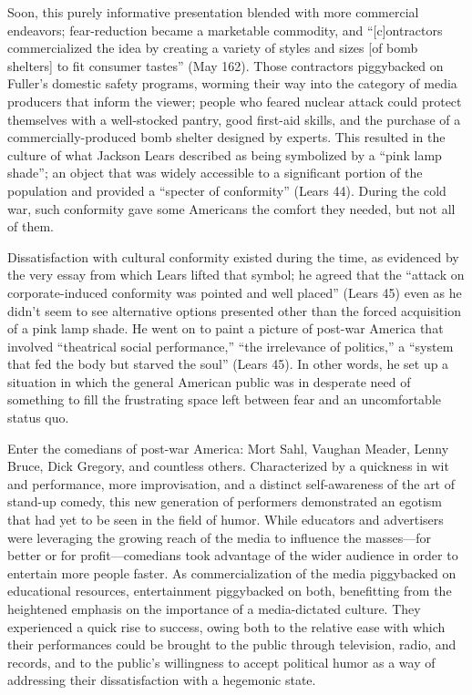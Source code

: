 Soon, this purely informative presentation blended with more commercial
endeavors; fear-reduction became a marketable commodity, and ``[c]ontractors
commercialized the idea by creating a variety of styles and sizes [of bomb
shelters] to fit consumer tastes'' (May 162). Those contractors piggybacked on
Fuller's domestic safety programs, worming their way into the category of media
producers that inform the viewer; people who feared nuclear attack could protect
themselves with a well-stocked pantry, good first-aid skills, and the purchase
of a commercially-produced bomb shelter designed by experts. This resulted in
the culture of what Jackson Lears described as being symbolized by a ``pink lamp
shade''; an object that was widely accessible to a significant portion of the
population and provided a ``specter of conformity'' (Lears 44). During the cold
war, such conformity gave some Americans the comfort they needed, but not all of
them.

Dissatisfaction with cultural conformity existed during the time, as evidenced
by the very essay from which Lears lifted that symbol; he agreed that the
``attack on corporate-induced conformity was pointed and well placed'' (Lears 45)
even as he didn't seem to see alternative options presented other than the
forced acquisition of a pink lamp shade. He went on to paint a picture of
post-war America that involved ``theatrical social performance,'' ``the irrelevance
of politics,'' a ``system that fed the body but starved the soul'' (Lears 45). In
other words, he set up a situation in which the general American public was in
desperate need of something to fill the frustrating space left between fear and
an uncomfortable status quo.

Enter the comedians of post-war America: Mort Sahl, Vaughan Meader, Lenny Bruce,
Dick Gregory, and countless others. Characterized by a quickness in wit and
performance, more improvisation, and a distinct self-awareness of the art of
stand-up comedy, this new generation of performers demonstrated an egotism that
had yet to be seen in the field of humor. While educators and advertisers were
leveraging the growing reach of the media to influence the masses—for better or
for profit—comedians took advantage of the wider audience in order to entertain
more people faster. As commercialization of the media piggybacked on educational
resources, entertainment piggybacked on both, benefitting from the heightened
emphasis on the importance of a media-dictated culture. They experienced a quick
rise to success, owing both to the relative ease with which their performances
could be brought to the public through television, radio, and records, and to
the public's willingness to accept political humor as a way of addressing their
dissatisfaction with a hegemonic state.

